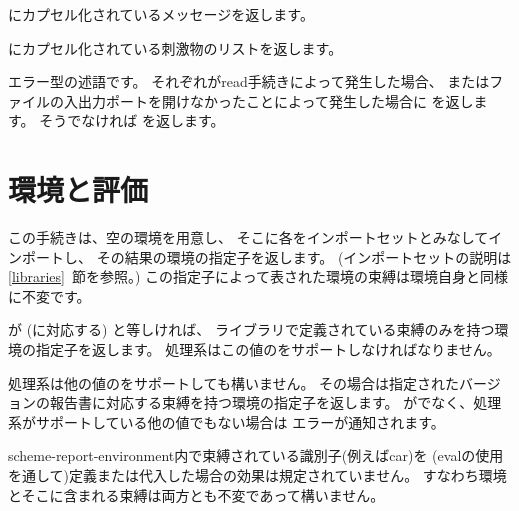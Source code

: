 \begin{entry}{%
}

にカプセル化されているメッセージを返します。

\end{entry}

\begin{entry}{%
}

にカプセル化されている刺激物のリストを返します。

\end{entry}

\begin{entry}{%
}

エラー型の述語です。
それぞれが{\cf read}手続きによって発生した場合、
またはファイルの入出力ポートを開けなかったことによって発生した場合に %
\schtrue{}を返します。
そうでなければ \schfalse{}を返します。

\end{entry}

\section{環境と評価}

\begin{entry}{%
}
\label{environments}

この手続きは、空の環境を用意し、
そこに各をインポートセットとみなしてインポートし、
その結果の環境の指定子を返します。
(インポートセットの説明は\ref{libraries}~節を参照。)
この指定子によって表された環境の束縛は環境自身と同様に不変です。

\end{entry}

\begin{entry}{%
}

が{} (\rfivers{}に対応する) と等しければ、
\rfivers{}ライブラリで定義されている束縛のみを持つ環境の指定子を返します。
処理系はこの値のをサポートしなければなりません。

処理系は他の値のをサポートしても構いません。
その場合は指定されたバージョンの報告書に対応する束縛を持つ環境の指定子を返します。
が{}でなく、処理系がサポートしている他の値でもない場合は
エラーが通知されます。

{\cf scheme-report-environment}内で束縛されている識別子(例えば{\cf car})を
({\cf eval}の使用を通して)定義または代入した場合の効果は規定されていません。
すなわち環境とそこに含まれる束縛は両方とも不変であって構いません。

\end{entry}

